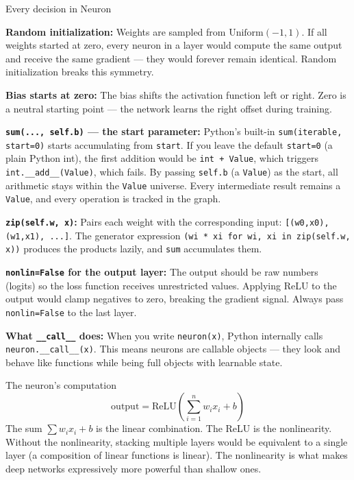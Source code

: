 \documentclass[12pt,a4paper]{article}
\newcommand{\code}[1]{\texttt{\small\color{deepblue}#1}}
\begin{document}
\begin{codeexplainbox}{Every decision in Neuron}

\textbf{Random initialization:} Weights are sampled from $\text{Uniform}(-1, 1)$. If all weights started at zero, every neuron in a layer would compute the same output and receive the same gradient — they would forever remain identical. Random initialization breaks this symmetry.

\textbf{Bias starts at zero:} The bias shifts the activation function left or right. Zero is a neutral starting point — the network learns the right offset during training.

\textbf{\code{sum(..., self.b)} — the start parameter:} Python's built-in \code{sum(iterable, start=0)} starts accumulating from \code{start}. If you leave the default \code{start=0} (a plain Python int), the first addition would be \code{int + Value}, which triggers \code{int.\_\_add\_\_(Value)}, which fails. By passing \code{self.b} (a \code{Value}) as the start, all arithmetic stays within the \code{Value} universe. Every intermediate result remains a \code{Value}, and every operation is tracked in the graph.

\textbf{\code{zip(self.w, x)}:} Pairs each weight with the corresponding input: \code{[(w0,x0), (w1,x1), ...]}. The generator expression \code{(wi * xi for wi, xi in zip(self.w, x))} produces the products lazily, and \code{sum} accumulates them.

\textbf{\code{nonlin=False} for the output layer:} The output should be raw numbers (logits) so the loss function receives unrestricted values. Applying ReLU to the output would clamp negatives to zero, breaking the gradient signal. Always pass \code{nonlin=False} to the last layer.

\textbf{What \code{\_\_call\_\_} does:} When you write \code{neuron(x)}, Python internally calls \code{neuron.\_\_call\_\_(x)}. This means neurons are callable objects — they look and behave like functions while being full objects with learnable state.
\end{codeexplainbox}

\begin{mathbox}{The neuron's computation}
\[
\text{output} = \text{ReLU}\!\left(\sum_{i=1}^{n} w_i x_i + b\right)
\]
The sum $\sum w_i x_i + b$ is the linear combination. The ReLU is the nonlinearity. Without the nonlinearity, stacking multiple layers would be equivalent to a single layer (a composition of linear functions is linear). The nonlinearity is what makes deep networks expressively more powerful than shallow ones.
\end{mathbox}
\end{document}
